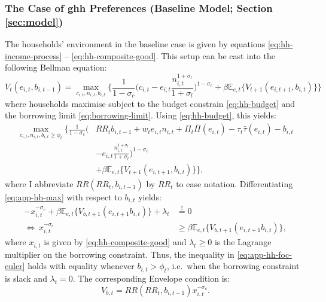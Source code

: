 \documentclass[a4paper,12pt]{article} %
\numberwithin{equation}{section} %
\numberwithin{figure}{section}
\numberwithin{table}{section}
\begin{document}
\begin{refsection}
\begin{appendices}
\subsubsection*{The Case of \Gls{ghh} Preferences (Baseline Model; Section \ref{sec:model})}

The households' environment in the baseline case is given by equations \eqref{eq:hh-income-process} -- \eqref{eq:hh-composite-good}. This setup can be cast into the following Bellman equation:
\begin{equation}
    V_t (e_{i,t}, b_{i,t-1}) = \max_{c_{i,t}, n_{i,t}, b_{i,t}} \Bigg\{ \frac{1}{1-\sigma_c} \Bigg( c_{i,t} - e_{i,t}\frac{n_{i,t}^{1+\sigma_l}}{1+\sigma_l} \Bigg)^{1-\sigma_c} + \beta \mathbb{E}_{e,t} \{ V_{t+1} (e_{i,t+1}, b_{i,t}) \} \Bigg\} \label{eq:app-hh-bellman}
\end{equation}
where households maximise subject to the budget constrain \eqref{eq:hh-budget} and the borrowing limit \eqref{eq:borrowing-limit}. Using \eqref{eq:hh-budget}, this yields:
\begin{align}
    \max_{c_{i,t}, n_{i,t}, b_{i,t} \ge \phi_t} \Bigg\{ \frac{1}{1-\sigma_c} \Bigg( &RR_t b_{i,t-1} + w_t e_{i,t} n_{i,t} + \Pi_t \bar{\Pi} (e_{i,t}) - \tau_t \bar{\tau} (e_{i,t}) - b_{i,t} \nonumber \\ 
    &- e_{i,t}\frac{n_{i,t}^{1+\sigma_l}}{1+\sigma_l} \Bigg)^{1-\sigma_c} \nonumber \\ 
    &+ \beta \mathbb{E}_{e,t} \{ V_{t+1} (e_{i,t+1}, b_{i,t}) \} \Bigg\}, \label{eq:app-hh-max}
\end{align}
where I abbreviate $RR (RR_t, b_{i,t-1})$ by $RR_t$ to ease notation. Differentiating \eqref{eq:app-hh-max} with respect to $b_{i,t}$ yields:
\begin{align}
    - x_{i,t}^{-\sigma_c} + \beta \mathbb{E}_{e,t} \{ V_{b,t+1} (e_{i,t+1} b_{i,t} ) \} + \lambda_t &\overset{!}{=} 0 \nonumber \\
    \Leftrightarrow \ x_{i,t}^{-\sigma_c} &\ge \beta \mathbb{E}_{e,t} \{ V_{b,t+1} (e_{i,t+1} b_{i,t} ) \}, \label{eq:app-hh-foc-euler}
\end{align}
where $x_{i,t}$ is given by \eqref{eq:hh-composite-good} and $\lambda_t \ge 0$ is the Lagrange multiplier on the borrowing constraint. Thus, the inequality in \eqref{eq:app-hh-foc-euler} holds with equality whenever $b_{i,t} > \phi_t$, i.e.~when the borrowing constraint is slack and $\lambda_t = 0$. The corresponding Envelope condition is:
\begin{equation}
    V_{b,t} = RR (RR_t, b_{i,t-1}) x_{i,t}^{-\sigma_c}. \label{eq:app-hh-foc-envelope}
\end{equation}


\end{appendices}
\end{refsection}
\end{document}
